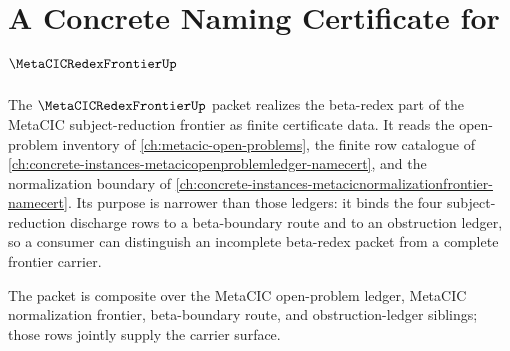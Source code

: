 \chapter{A Concrete Naming Certificate for $\MetaCICRedexFrontierUp$}
\label{ch:concrete-instances-metacic-redex-frontier-namecert}

The $\MetaCICRedexFrontierUp$ packet realizes the beta-redex part of the
MetaCIC subject-reduction frontier as finite certificate data. It reads the
open-problem inventory of \autoref{ch:metacic-open-problems}, the
finite row catalogue of
\autoref{ch:concrete-instances-metacicopenproblemledger-namecert}, and the
normalization boundary of
\autoref{ch:concrete-instances-metacicnormalizationfrontier-namecert}. Its
purpose is narrower than those ledgers: it binds the four subject-reduction
discharge rows to a beta-boundary route and to an obstruction ledger, so a
consumer can distinguish an incomplete beta-redex packet from a complete
frontier carrier.

The packet is composite over the MetaCIC open-problem ledger, MetaCIC
normalization frontier, beta-boundary route, and obstruction-ledger siblings;
those rows jointly supply the carrier surface.




